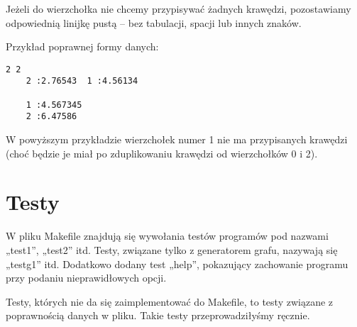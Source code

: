 \documentclass[]{article}
\begin{document}
Jeżeli do wierzchołka nie chcemy przypisywać żadnych krawędzi, pozostawiamy odpowiednią linijkę pustą – bez tabulacji, spacji lub innych znaków.

Przykład poprawnej formy danych:
\begin{verbatim}
2 2
    2 :2.76543  1 :4.56134

    1 :4.567345
    2 :6.47586
\end{verbatim}
W powyższym przykładzie wierzchołek numer 1 nie ma przypisanych krawędzi (choć będzie je miał po zduplikowaniu krawędzi od wierzchołków 0 i 2).
\section{Testy}\label{header-n233}

W pliku Makefile znajdują się wywołania testów programów pod nazwami „test1”, „test2” itd. Testy, związane tylko z generatorem grafu, nazywają się „testg1” itd. Dodatkowo dodany test „help”, pokazujący zachowanie programu przy podaniu nieprawidłowych opcji.

Testy, których nie da się zaimplementować do Makefile, to testy związane z poprawnością danych w pliku. Takie testy przeprowadziłyśmy ręcznie.
\end{document}
